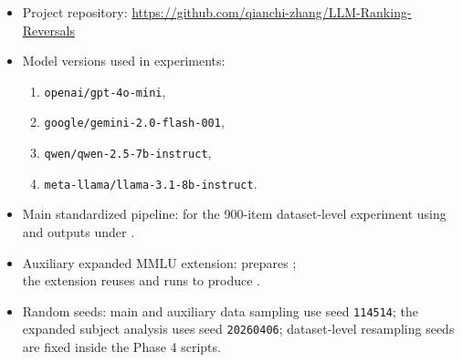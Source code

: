 \documentclass[11pt]{article}
\theoremstyle{definition}
\begin{document}
\begin{itemize}[leftmargin=*]
    \item Project repository: \url{https://github.com/qianchi-zhang/LLM-Ranking-Reversals}
    \item Model versions used in experiments:
    \begin{enumerate}
        \item \texttt{openai/gpt-4o-mini},
        \item \texttt{google/gemini-2.0-flash-001},
        \item \texttt{qwen/qwen-2.5-7b-instruct},
        \item \texttt{meta-llama/llama-3.1-8b-instruct}.
    \end{enumerate}
    \item Main standardized pipeline:  for the 900-item dataset-level experiment using  and outputs under .
    \item Auxiliary expanded MMLU extension:  prepares ;    \\
    the extension reuses  and runs  to produce .
    \item Random seeds: main and auxiliary data sampling use seed \texttt{114514}; the expanded subject analysis uses seed \texttt{20260406}; dataset-level resampling seeds are fixed inside the Phase 4 scripts.
\end{itemize}
\end{document}

